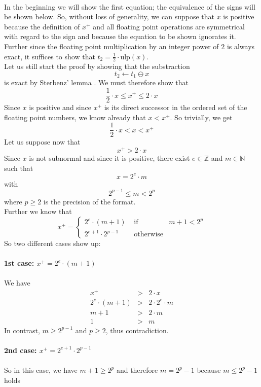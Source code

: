 \documentclass[a4paper,10pt,twoside]{article}
\newenvironment{proof}[1][Proof]{\begin{trivlist}
\item[\hskip \labelsep {\bfseries #1}]}{\end{trivlist}}
\newcommand{\N}{\ensuremath{\mathbb {N}}}
\newcommand{\Z}{\ensuremath{\mathbb {Z}}}
\newcommand{\mUlp}{\ensuremath{\mathrm{ulp}}}
\begin{document}
\begin{proof} ~ \\
In the beginning we will show the first equation; the equivalence of the signs will be shown below.
So, without loss of generality, we can suppose that $x$ is positive because the definition of $x^+$ and all
floating point operations are symmetrical with regard to the sign \cite{IEEE754}
and because the equation to be shown ignorates it.
Further since the floating point multiplication by an integer power of $2$ is always exact, it suffices to show that
$t_2 = \frac{1}{2} \cdot \mUlp \left( x \right)$.\\
Let us still start the proof by showing that the substraction
$$t_2 \gets t_1 \ominus x$$
is exact by Sterbenz' lemma \cite{Ste74}. We must therefore show that
$$\frac{1}{2} \cdot x \leq x^+ \leq 2 \cdot x$$
Since $x$ is positive and since $x^+$ is its direct successor in the ordered set of the floating point numbers, we know
already that $x < x^+$.
So trivially, we get $$\frac{1}{2} \cdot x < x < x^+$$
Let us suppose now that
$$x^+ > 2 \cdot x$$
Since $x$ is not subnormal and since it is positive, there exist $e \in \Z$ and $m \in \N$ such that
$$x = 2^e \cdot m$$
with
$$2^{p-1} \leq m < 2^p$$
where $p\geq 2$ is the precision of the format.\\
Further we know that
$$x^+ = \left \lbrace \begin{array}{lll} 2^e \cdot \left(m + 1 \right) & \mbox{ if } & m+1 < 2^p \\
                                         2^{e+1} \cdot 2^{p-1} & \mbox{ otherwise} & \end{array} \right.$$
So two different cases show up: \\ ~ \\
{\bf 1st case: $x^+ = 2^e \cdot \left( m + 1 \right)$} \\ ~ \\
We have
\begin{eqnarray*}
x^+ & > & 2 \cdot x \\
2^e \cdot \left( m + 1 \right) & > & 2 \cdot 2^e \cdot m \\
m+1 & > & 2 \cdot m \\
1 & > & m
\end{eqnarray*}
In contrast, $m \geq 2^{p-1}$ and $p \geq 2$, thus contradiction. \\ ~ \\
{\bf 2nd case: $x^+ = 2^{e+1} \cdot 2^{p-1}$} \\ ~ \\
So in this case, we have $m+1\geq 2^p$ and therefore $m=2^p - 1$ because $m \leq 2^p - 1$ holds

\end{proof}
\end{document}
